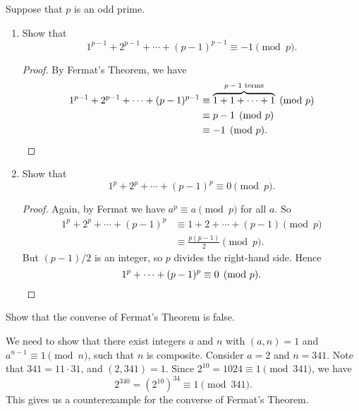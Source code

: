  Suppose that $p$ is an odd prime.
\begin{enumerate}
\item Show that
  \begin{equation*}
    1^{p-1} + 2^{p-1} + \cdots + (p - 1)^{p-1} \equiv -1 \pmod{p}.
  \end{equation*}
  \begin{proof}
    By Fermat's Theorem, we have
    \begin{align*}
      1^{p-1} + 2^{p-1} + \cdots + (p - 1)^{p-1}
      &\equiv \overbrace{1 + 1 + \cdots + 1}^{\text{$p - 1$ terms}} \pmod{p} \\
      &\equiv p - 1 \pmod{p} \\
      &\equiv -1 \pmod{p}. \qedhere
    \end{align*}
  \end{proof}

\item Show that
  \begin{equation*}
    1^p + 2^p + \cdots + (p - 1)^p \equiv 0 \pmod{p}.
  \end{equation*}
  \begin{proof}
    Again, by Fermat we have $a^p\equiv a\pmod{p}$ for all $a$. So
    \begin{align*}
      1^p + 2^p + \cdots + (p-1)^p
      &\equiv 1 + 2 + \cdots + (p - 1) \pmod{p} \\
      &\equiv \frac{p(p - 1)}2 \pmod{p}.
    \end{align*}
    But $(p - 1) / 2$ is an integer, so $p$ divides the right-hand
    side. Hence
    \begin{equation*}
      1^p + \cdots + (p - 1)^p \equiv 0\pmod{p}. \qedhere
    \end{equation*}
  \end{proof}
\end{enumerate}

 Show that the converse of Fermat's Theorem is false.
\begin{solution}
  We need to show that there exist integers $a$ and $n$ with
  $(a,n) = 1$ and $a^{n-1}\equiv1\pmod{n}$, such that $n$ is
  composite. Consider $a = 2$ and $n = 341$. Note that
  $341 = 11\cdot31$, and $(2,341) = 1$. Since
  $2^{10} = 1024 \equiv 1\pmod{341}$, we have
  \begin{equation*}
    2^{340} = (2^{10})^{34} \equiv 1\pmod{341}.
  \end{equation*}
  This gives us a counterexample for the converse of Fermat's Theorem.
\end{solution}

